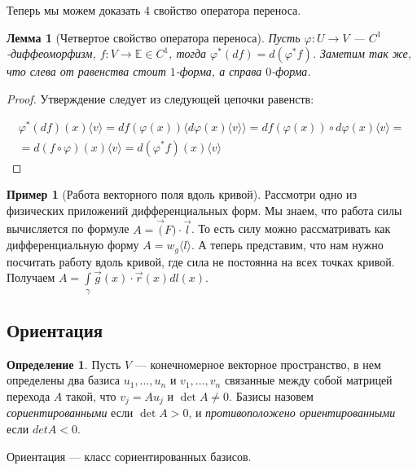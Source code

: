 \documentclass[a5paper]{article}
\newcounter{through}
\theoremstyle{plain}
\newtheorem{lemma}[through]{Лемма}
\theoremstyle{definition}
\newtheorem{definition}[through]{Определение}
\newtheorem{example}[through]{Пример}
\numberwithin{through}{section}
\numberwithin{equation}{section}
\begin{document}
Теперь мы можем доказать 4 свойство оператора переноса.

\begin{lemma}[Четвертое свойство оператора переноса]
	Пусть $\varphi : U \to V$ --- $C^1$-диффеоморфизм, $f : V \to \mathbb{E} \in C^1$, тогда $\varphi^{*}(d f) = d (\varphi^{*} f)$. Заметим так же, что слева от равенства стоит $1$-форма, а справа $0$-форма.
\end{lemma}

\begin{proof}
	Утверждение следует из следующей цепочки равенств:
	
	\begin{align*}
		\varphi^{*}(df)(x) \langle v \rangle  = df (\varphi (x)) \langle d\varphi(x) \langle v \rangle \rangle = df (\varphi (x)) \circ d \varphi(x) \langle v \rangle =\\ = d (f \circ \varphi )(x) \langle v \rangle = d(\varphi^{*}f)(x) \langle v \rangle
	\end{align*}
\end{proof}

\begin{example}[Работа векторного поля вдоль кривой]
	Рассмотри одно из физических приложений дифференциальных форм. Мы знаем, что работа силы вычисляется по формуле $A = \vec(F) \cdot \vec{l}$. То есть силу можно рассматривать как дифференциальную форму $A = w_g \langle l \rangle$. А теперь представим, что нам нужно посчитать работу вдоль кривой, где сила не постоянна на всех точках кривой. Получаем $A = \int\limits_{\gamma} \vec{g}(x) \cdot \vec{r}(x) d l(x)$.
\end{example}

\subsection{Ориентация} %

\begin{definition}
	Пусть $V$ --- конечномерное векторное пространство, в нем 
	определены два базиса $u_1,\ldots,u_n$ и $v_1,\ldots,v_n$ связанные
	между собой матрицей перехода $A$ такой, что $v_j = Au_j$ и $\det A \ne 0$.
	Базисы назовем \textit{сориентированными} если $\det A > 0$, и \textit{противоположено ориентированными}
	если $det A < 0$. 
\end{definition}

Ориентация --- класс сориентированных базисов.
\end{document}
